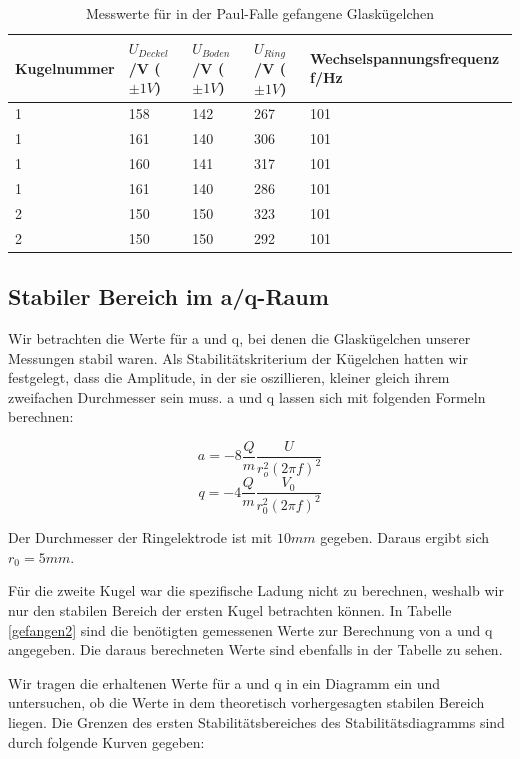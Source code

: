 \documentclass[10pt,a4paper]{article}
\begin{document}
\begin{table}[h!]
	\centering
	\begin{tabular}{|l|l|l|l|l|}\hline
		Kugelnummer & $U_{Deckel}$/V ($\pm 1V$)& $U_{Boden}$/V ($\pm 1V$)& $U_{Ring}$/V ($\pm 1V$)& Wechselspannungsfrequenz f/Hz\\\hline
		1 & 158 & 142 & 267 & 101\\
		1 & 161 & 140 & 306 & 101\\
		1 & 160 & 141 & 317 & 101\\
		1 & 161 & 140 & 286 & 101\\
		2 & 150 & 150 & 323 & 101\\
		2 & 150 & 150 & 292 & 101\\\hline
	\end{tabular}
	\caption{Messwerte für in der Paul-Falle gefangene Glaskügelchen}
	\label{gefangen}
\end{table}

\subsection{Stabiler Bereich im a/q-Raum}

Wir betrachten die Werte für a und q, bei denen die Glaskügelchen unserer Messungen stabil waren. Als Stabilitätskriterium der Kügelchen hatten wir festgelegt, dass die Amplitude, in der sie oszillieren, kleiner gleich ihrem zweifachen Durchmesser sein muss. a und q lassen sich mit folgenden Formeln berechnen:

\begin{equation}
	a = -8 \frac{Q}{m} \frac{U}{r_o^2 (2 \pi f)^2}
\end{equation}
\begin{equation}
	q = -4 \frac{Q}{m} \frac{V_0}{r_0^2 (2\pi f)^2}
\end{equation}

Der Durchmesser der Ringelektrode ist mit $10mm$ gegeben. Daraus ergibt sich $r_0 = 5mm$.

Für die zweite Kugel war die spezifische Ladung nicht zu berechnen, weshalb wir nur den stabilen Bereich der ersten Kugel betrachten können. In Tabelle \ref{gefangen2} sind die benötigten gemessenen Werte zur Berechnung von a und q angegeben. Die daraus berechneten Werte sind ebenfalls in der Tabelle zu sehen. 

Wir tragen die erhaltenen Werte für a und q in ein Diagramm ein und untersuchen, ob die Werte in dem theoretisch vorhergesagten stabilen Bereich liegen. Die Grenzen des ersten Stabilitätsbereiches des Stabilitätsdiagramms sind durch folgende Kurven gegeben:
\end{document}
